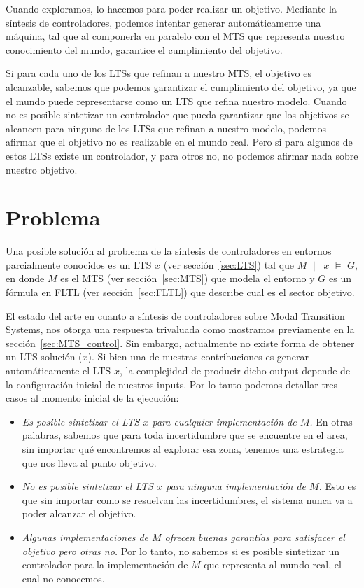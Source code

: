 Cuando exploramos, lo hacemos para poder realizar un objetivo. Mediante la 
síntesis de controladores, podemos intentar 
generar automáticamente una máquina, tal que al componerla en paralelo con el 
MTS que representa nuestro conocimiento 
del mundo, garantice el cumplimiento del objetivo.

Si para cada uno de los LTSs que refinan a nuestro MTS, el objetivo es 
alcanzable, sabemos que podemos garantizar el
cumplimiento del objetivo, ya que el mundo puede representarse como un LTS que 
refina nuestro modelo. Cuando no es posible
sintetizar un controlador que pueda garantizar que los objetivos se alcancen 
para ninguno de los LTSs que refinan a nuestro
modelo, podemos afirmar que el objetivo no es realizable en el mundo real. Pero 
si para algunos de estos LTSs existe un
controlador, y para otros no, no podemos afirmar nada sobre nuestro objetivo.

\section{Problema}

Una posible solución al problema de la síntesis de controladores en entornos 
parcialmente conocidos es un LTS $x$ (ver sección~\ref{sec:LTS}) tal que 
$M$ $\parallel$ $x$ $\models$ $G$, en donde $M$ es el MTS (ver 
sección~\ref{sec:MTS}) que modela el entorno y $G$ es un fórmula en FLTL (ver 
sección~\ref{sec:FLTL}) que describe cual es el sector objetivo. 

El estado del arte en cuanto a síntesis de controladores sobre Modal Transition 
Systems, nos otorga una respuesta trivaluada como mostramos previamente en la 
sección~\ref{sec:MTS_control}. Sin embargo, actualmente no existe forma de 
obtener un LTS solución ($x$). Si bien una de nuestras contribuciones es 
generar automáticamente el LTS $x$, la complejidad de producir dicho output 
depende de la configuración inicial de nuestros inputs. 
Por lo tanto podemos detallar tres casos al momento inicial de la ejecución:

\begin{itemize}

\item
\textit{Es posible sintetizar el LTS $x$ para cualquier implementación de $M$.} 
En otras 
palabras, sabemos que para toda incertidumbre que se encuentre en el area, sin 
importar qué encontremos al explorar esa zona, tenemos una estrategia que nos 
lleva al punto objetivo.

\item
\textit{No es posible sintetizar el LTS $x$ para ninguna implementación de 
$M$.} Esto es que sin importar como se resuelvan las incertidumbres, el sistema 
nunca va a poder alcanzar el objetivo.

\item
\textit{Algunas implementaciones de $M$ ofrecen buenas garantías para 
satisfacer el 
objetivo pero otras no. }
Por lo tanto, no sabemos si es posible sintetizar un controlador para la implementación de $M$ que representa al mundo real, el cual no conocemos.

\end{itemize}

